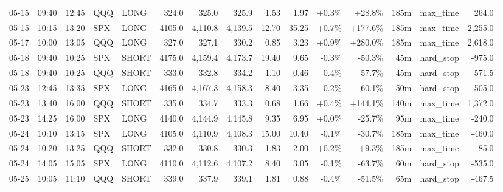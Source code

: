 \documentclass[11pt,a4paper,twoside]{article}
\begin{document}
\begin{landscape}
\begin{center}
\begin{longtable}{>{\color{txtmain}}l l l l l r r r r r r r r >{\color{txtmain}}l r}
05-15 & 09:40 & 12:45 & QQQ & LONG & 324.0 & 325.0 & 325.9 & 1.53 & 1.97 & \textcolor{wingreen}{+0.3\%} & \textcolor{wingreen}{+28.8\%} & 185m & max\_time & \textcolor{wingreen}{264.0} \\
05-15 & 10:15 & 13:20 & SPX & LONG & 4105.0 & 4,110.8 & 4,139.5 & 12.70 & 35.25 & \textcolor{wingreen}{+0.7\%} & \textcolor{wingreen}{+177.6\%} & 185m & max\_time & \textcolor{wingreen}{2,255.0} \\
05-17 & 10:00 & 13:05 & QQQ & LONG & 327.0 & 327.1 & 330.2 & 0.85 & 3.23 & \textcolor{wingreen}{+0.9\%} & \textcolor{wingreen}{+280.0\%} & 185m & max\_time & \textcolor{wingreen}{2,618.0} \\
05-18 & 09:40 & 10:25 & SPX & SHORT & 4175.0 & 4,159.4 & 4,173.7 & 19.40 & 9.65 & \textcolor{lossred}{-0.3\%} & \textcolor{lossred}{-50.3\%} & 45m & hard\_stop & \textcolor{lossred}{-975.0} \\
05-18 & 09:40 & 10:25 & QQQ & SHORT & 333.0 & 332.8 & 334.2 & 1.10 & 0.46 & \textcolor{lossred}{-0.4\%} & \textcolor{lossred}{-57.7\%} & 45m & hard\_stop & \textcolor{lossred}{-571.5} \\
05-23 & 12:45 & 13:35 & SPX & LONG & 4165.0 & 4,167.3 & 4,158.3 & 8.40 & 3.35 & \textcolor{lossred}{-0.2\%} & \textcolor{lossred}{-60.1\%} & 50m & hard\_stop & \textcolor{lossred}{-505.0} \\
05-23 & 13:40 & 16:00 & QQQ & SHORT & 335.0 & 334.7 & 333.3 & 0.68 & 1.66 & \textcolor{wingreen}{+0.4\%} & \textcolor{wingreen}{+144.1\%} & 140m & max\_time & \textcolor{wingreen}{1,372.0} \\
05-23 & 14:25 & 16:00 & SPX & LONG & 4140.0 & 4,144.9 & 4,145.8 & 9.35 & 6.95 & \textcolor{wingreen}{+0.0\%} & \textcolor{lossred}{-25.7\%} & 95m & max\_time & \textcolor{lossred}{-240.0} \\
05-24 & 10:10 & 13:15 & SPX & LONG & 4105.0 & 4,110.9 & 4,108.3 & 15.00 & 10.40 & \textcolor{lossred}{-0.1\%} & \textcolor{lossred}{-30.7\%} & 185m & max\_time & \textcolor{lossred}{-460.0} \\
05-24 & 10:20 & 13:25 & QQQ & SHORT & 332.0 & 330.8 & 330.3 & 1.83 & 2.00 & \textcolor{wingreen}{+0.2\%} & \textcolor{wingreen}{+9.3\%} & 185m & max\_time & \textcolor{wingreen}{85.0} \\
05-24 & 14:05 & 15:05 & SPX & LONG & 4110.0 & 4,112.6 & 4,107.2 & 8.40 & 3.05 & \textcolor{lossred}{-0.1\%} & \textcolor{lossred}{-63.7\%} & 60m & hard\_stop & \textcolor{lossred}{-535.0} \\
05-25 & 10:05 & 11:10 & QQQ & SHORT & 339.0 & 337.9 & 339.1 & 1.81 & 0.88 & \textcolor{lossred}{-0.4\%} & \textcolor{lossred}{-51.5\%} & 65m & hard\_stop & \textcolor{lossred}{-467.5} \\

\end{longtable}
\end{center}
\end{landscape}
\end{document}
